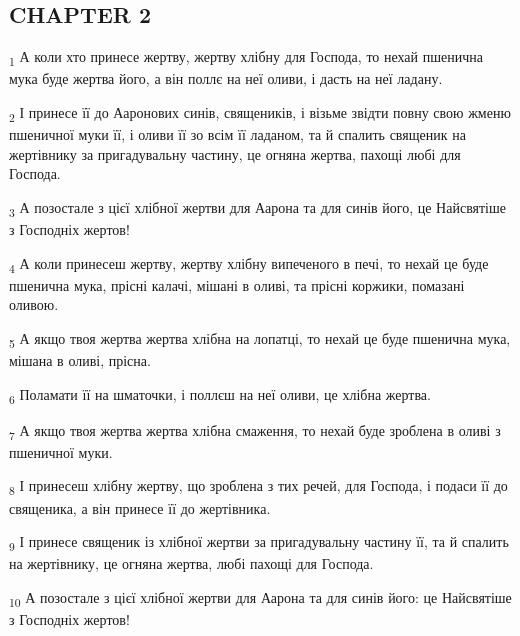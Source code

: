 \subsection{CHAPTER 2}
\begin{tcolorbox}
\textsubscript{1} А коли хто принесе жертву, жертву хлібну для Господа, то нехай пшенична мука буде жертва його, а він поллє на неї оливи, і дасть на неї ладану.
\end{tcolorbox}
\begin{tcolorbox}
\textsubscript{2} І принесе її до Ааронових синів, священиків, і візьме звідти повну свою жменю пшеничної муки її, і оливи її зо всім її ладаном, та й спалить священик на жертівнику за пригадувальну частину, це огняна жертва, пахощі любі для Господа.
\end{tcolorbox}
\begin{tcolorbox}
\textsubscript{3} А позостале з цієї хлібної жертви для Аарона та для синів його, це Найсвятіше з Господніх жертов!
\end{tcolorbox}
\begin{tcolorbox}
\textsubscript{4} А коли принесеш жертву, жертву хлібну випеченого в печі, то нехай це буде пшенична мука, прісні калачі, мішані в оливі, та прісні коржики, помазані оливою.
\end{tcolorbox}
\begin{tcolorbox}
\textsubscript{5} А якщо твоя жертва жертва хлібна на лопатці, то нехай це буде пшенична мука, мішана в оливі, прісна.
\end{tcolorbox}
\begin{tcolorbox}
\textsubscript{6} Поламати її на шматочки, і поллєш на неї оливи, це хлібна жертва.
\end{tcolorbox}
\begin{tcolorbox}
\textsubscript{7} А якщо твоя жертва жертва хлібна смаження, то нехай буде зроблена в оливі з пшеничної муки.
\end{tcolorbox}
\begin{tcolorbox}
\textsubscript{8} І принесеш хлібну жертву, що зроблена з тих речей, для Господа, і подаси її до священика, а він принесе її до жертівника.
\end{tcolorbox}
\begin{tcolorbox}
\textsubscript{9} І принесе священик із хлібної жертви за пригадувальну частину її, та й спалить на жертівнику, це огняна жертва, любі пахощі для Господа.
\end{tcolorbox}
\begin{tcolorbox}
\textsubscript{10} А позостале з цієї хлібної жертви для Аарона та для синів його: це Найсвятіше з Господніх жертов!
\end{tcolorbox}
